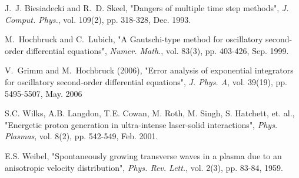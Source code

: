 \documentclass[conference]{IEEEtran}
\renewcommand{\~}{\widetilde }
\begin{document}
\begin{thebibliography}{}
 J.~J. Biesiadecki and R.~D. Skeel,
"Dangers of multiple time step methods", 
{\em J. Comput. Phys.}, vol. 109(2), pp. 318-328, Dec. 1993.

 M.~Hochbruck and C.~Lubich,
"A {G}autschi-type method for oscillatory second-order differential equations", 
{\em Numer. Math.}, vol. 83(3), pp. 403-426, Sep. 1999.

V.~Grimm and M.~Hochbruck  (2006), 
"Error analysis of exponential integrators for oscillatory second-order differential equations", 
{\em J. Phys. A}, vol. 39(19), pp. 5495-5507, May. 2006

S.C. Wilks, A.B. Langdon, T.E. Cowan, M. Roth, M. Singh, S. Hatchett, et. al.,
"Energetic proton generation in ultra-intense laser-solid interactions",
{\em Phys. Plasmas}, vol. 8(2), pp. 542-549, Feb. 2001.




 E.S. Weibel, 
"Spontaneously growing transverse waves in a plasma due to an anisotropic velocity distribution",
{\em Phys. Rev. Lett.}, vol. 2(3), pp. 83-84, 1959.


\end{thebibliography}{}
\end{document}
